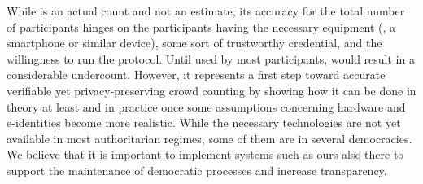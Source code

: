 
While \CROCUS is an actual count and not an estimate, its accuracy for the total number of participants hinges on the participants having the necessary equipment (\ie, a smartphone or similar device), some sort of trustworthy credential, and the willingness to run the protocol. 
Until used by most participants, \CROCUS would result in a considerable undercount. 
However, it represents a first step toward accurate verifiable yet privacy-preserving crowd counting by showing how it can be done in theory at least and in practice once some assumptions concerning hardware and e-identities become more realistic. 
While the necessary technologies are not yet available in most authoritarian regimes, some of them are in several democracies. We believe that it is important to implement systems such as ours also there to support the maintenance of democratic processes and increase transparency.  
